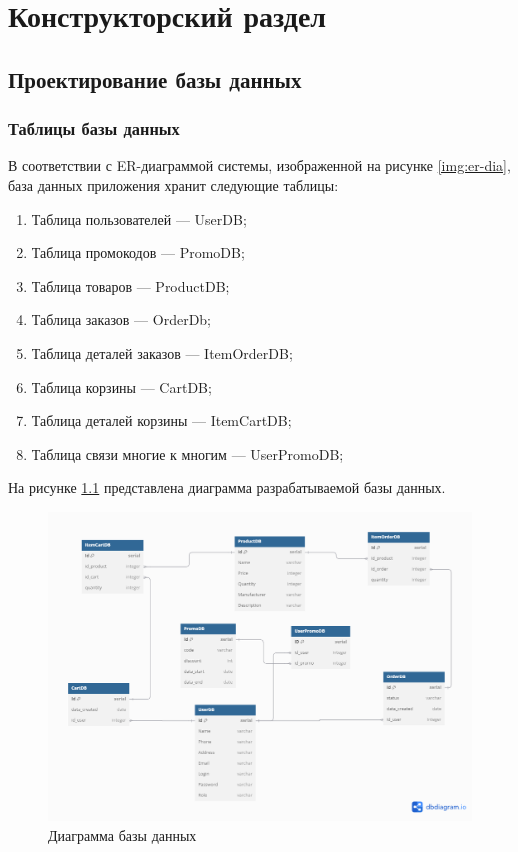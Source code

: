 \chapter{Конструкторский раздел}

\section{Проектирование базы данных}
\subsection{Таблицы базы данных}
В соответствии с ER-диаграммой системы, изображенной на рисунке \ref{img:er-dia}, база данных приложения хранит следующие таблицы:
\begin{enumerate}
	\item Таблица пользователей --- UserDB;
	\item Таблица промокодов --- PromoDB;
	\item Таблица товаров --- ProductDB;
	\item Таблица заказов --- OrderDb;
	\item Таблица деталей заказов --- ItemOrderDB;
	\item Таблица корзины --- CartDB;
	\item Таблица деталей корзины --- ItemCartDB;
	\item Таблица связи многие к многим --- UserPromoDB;
\end{enumerate}
\newpage
На рисунке \ref{img:er-db} представлена диаграмма разрабатываемой базы данных.
\begin{figure}[ht!]
	\centering
	\includegraphics[width=1\linewidth]{img/er_db.png}
	\caption{Диаграмма базы данных}
	\label{img:er-db}
\end{figure}


